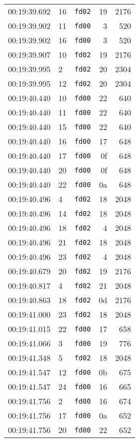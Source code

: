 \documentclass{article}
\begin{document}
\begin{longtable}{lllrr}
00:19:39.692 & 16 & \texttt{fd02} & 19 & 2176 \\
00:19:39.902 & 11 & \texttt{fd00} & 3 & 520 \\
00:19:39.902 & 16 & \texttt{fd00} & 3 & 520 \\
00:19:39.907 & 10 & \texttt{fd02} & 19 & 2176 \\
00:19:39.995 & 2 & \texttt{fd02} & 20 & 2304 \\
00:19:39.995 & 12 & \texttt{fd02} & 20 & 2304 \\
00:19:40.440 & 10 & \texttt{fd00} & 22 & 640 \\
00:19:40.440 & 11 & \texttt{fd00} & 22 & 640 \\
00:19:40.440 & 15 & \texttt{fd00} & 22 & 640 \\
00:19:40.440 & 16 & \texttt{fd00} & 17 & 648 \\
00:19:40.440 & 17 & \texttt{fd00} & 0f & 648 \\
00:19:40.440 & 20 & \texttt{fd00} & 0f & 648 \\
00:19:40.440 & 22 & \texttt{fd00} & 0a & 648 \\
00:19:40.496 & 4 & \texttt{fd02} & 18 & 2048 \\
00:19:40.496 & 14 & \texttt{fd02} & 18 & 2048 \\
00:19:40.496 & 18 & \texttt{fd02} & 4 & 2048 \\
00:19:40.496 & 21 & \texttt{fd02} & 18 & 2048 \\
00:19:40.496 & 23 & \texttt{fd02} & 4 & 2048 \\
00:19:40.679 & 20 & \texttt{fd02} & 19 & 2176 \\
00:19:40.817 & 4 & \texttt{fd02} & 21 & 2048 \\
00:19:40.863 & 18 & \texttt{fd02} & 0d & 2176 \\
00:19:41.000 & 23 & \texttt{fd02} & 18 & 2048 \\
00:19:41.015 & 22 & \texttt{fd00} & 17 & 658 \\
00:19:41.066 & 3 & \texttt{fd00} & 19 & 776 \\
00:19:41.348 & 5 & \texttt{fd02} & 18 & 2048 \\
00:19:41.547 & 12 & \texttt{fd00} & 0b & 675 \\
00:19:41.547 & 24 & \texttt{fd00} & 16 & 665 \\
00:19:41.756 & 2 & \texttt{fd00} & 16 & 674 \\
00:19:41.756 & 17 & \texttt{fd00} & 0a & 652 \\
00:19:41.756 & 20 & \texttt{fd00} & 22 & 652 \\

\end{longtable}
\end{document}
